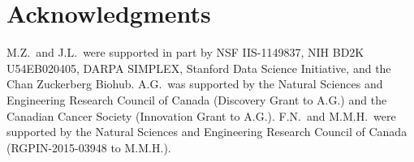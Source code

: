 \documentclass[5p]{elsarticle}
\newcommand{\rev}[1]{{\color{black}#1}}
\begin{document}
\section*{Acknowledgments}

\noindent M.Z.~and J.L.~were supported in part by NSF IIS-1149837, NIH BD2K U54EB020405, DARPA SIMPLEX, Stanford Data Science Initiative, and \rev{the Chan} Zuckerberg Biohub. A.G.~was supported by the Natural Sciences and Engineering Research Council of Canada (Discovery Grant to A.G.) and the Canadian Cancer Society (Innovation Grant to A.G.). F.N.~and M.M.H.~we\-re supported by the Natural Sciences and Engineering Research Council of Canada (RGPIN-2015-03948 to M.M.H.). 


\end{document}

